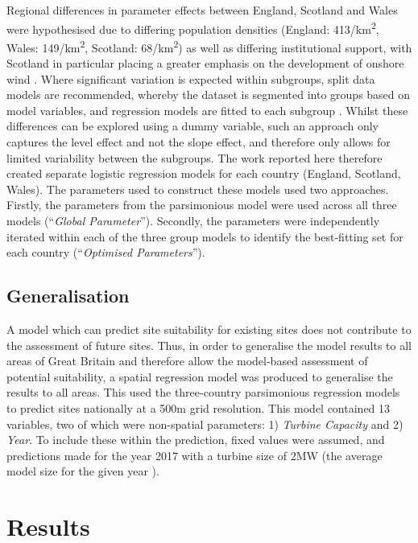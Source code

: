 \documentclass[a4paper,]{article}
\theoremstyle{definition}
\theoremstyle{definition}
\theoremstyle{definition}
\theoremstyle{remark}
\begin{document}
Regional differences in parameter effects between England, Scotland and Wales were hypothesised due to differing population densities (England: 413/km\textsuperscript{2}, Wales: 149/km\textsuperscript{2}, Scotland: 68/km\textsuperscript{2}) \citep{ONS2013} as well as differing institutional support, with Scotland in particular placing a greater emphasis on the development of onshore wind \citep{DECC2018}. Where significant variation is expected within subgroups, split data models are recommended, whereby the dataset is segmented into groups based on model variables, and regression models are fitted to each subgroup \citep{Stoltzfus2011}. Whilst these differences can be explored using a dummy variable, such an approach only captures the level effect and not the slope effect, and therefore only allows for limited variability between the subgroups. The work reported here therefore created separate logistic regression models for each country (England, Scotland, Wales). The parameters used to construct these models used two approaches. Firstly, the parameters from the parsimonious model were used across all three models (``\emph{Global Parameter}''). Secondly, the parameters were independently iterated within each of the three group models to identify the best-fitting set for each country (``\emph{Optimised Parameters}'').

\hypertarget{generalisation}{%
\subsection{Generalisation}\label{generalisation}}

A model which can predict site suitability for existing sites does not contribute to the assessment of future sites. Thus, in order to generalise the model results to all areas of Great Britain and therefore allow the model-based assessment of potential suitability, a spatial regression model was produced to generalise the results to all areas. This used the three-country parsimonious regression models to predict sites nationally at a 500m grid resolution. This model contained 13 variables, two of which were non-spatial parameters: 1) \emph{Turbine Capacity} and 2) \emph{Year}. To include these within the prediction, fixed values were assumed, and predictions made for the year 2017 with a turbine size of 2MW (the average model size for the given year \citep{DECC2018}).

\hypertarget{results}{%
\section{Results}\label{results}}
\end{document}
